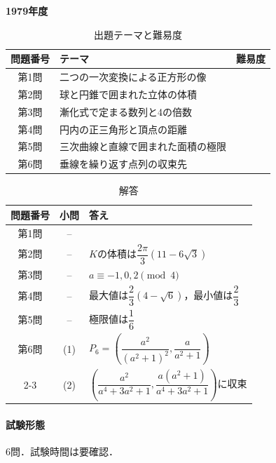 \documentclass[../../main.tex]{subfiles}
\begin{document}
\begin{center}
  {\fontsize{48pt}{58pt}\selectfont \textbf{1979}\normalsize\textbf{年度}}
\end{center}

\begin{table}[htb]
  \centering
  \caption{出題テーマと難易度}
  \begin{tabular}{|c|p{9cm}|c|}
    \hline
    \textbf{問題番号} & \textbf{テーマ} & \textbf{難易度} \\
    \hline
    第1問 & 二つの一次変換による正方形の像 & \\
    \hline
    第2問 & 球と円錐で囲まれた立体の体積 & \\
    \hline
    第3問 & 漸化式で定まる数列と4の倍数 & \\
    \hline
    第4問 & 円内の正三角形と頂点の距離 & \\
    \hline
    第5問 & 三次曲線と直線で囲まれた面積の極限 & \\
    \hline
    第6問 & 垂線を繰り返す点列の収束先 & \\
    \hline
  \end{tabular}
\end{table}

\begin{table}[htb]
  \centering
  \caption{解答}
  \renewcommand{\arraystretch}{1.4}
  \begin{tabular}{|c|c|p{9cm}|}
    \hline
    \textbf{問題番号} & \textbf{小問} & \textbf{答え} \\
    \hline
    第1問 & -- & \\
    \hline
    第2問 & -- & $K$の体積は$\dfrac{2\pi}{3}(11-6\sqrt{3})$ \\
    \hline
    第3問 & -- & $a\equiv-1,0,2\pmod{4}$ \\
    \hline
    第4問 & -- & 最大値は$\dfrac{2}{3}(4-\sqrt{6})$，最小値は$\dfrac{2}{3}$ \\
    \hline
    第5問 & -- & 極限値は$\dfrac{1}{6}$ \\
    \hline
    第6問 & (1) & $P_6=\left(\dfrac{a^2}{(a^2+1)^2},\dfrac{a}{a^2+1}\right)$ \\
    \cline{2-3}
    & (2) & $\left(\dfrac{a^2}{a^4+3a^2+1},\dfrac{a(a^2+1)}{a^4+3a^2+1}\right)$に収束 \\
    \hline
  \end{tabular}
\end{table}

\paragraph{試験形態}
6問．試験時間は要確認．
\end{document}
